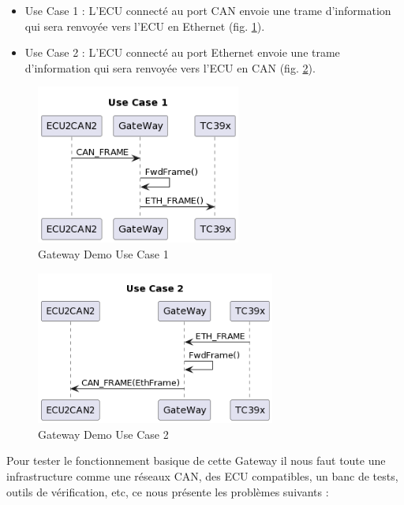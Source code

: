\begin{itemize} 

    \item Use Case 1 : L'ECU connect\'e au port CAN envoie une trame d'information qui sera renvoyée vers l'ECU en Ethernet (fig. \ref{fig:gw-demo-uc1}). 

    \item Use Case 2 : L'ECU connect\'e au port Ethernet envoie une trame d'information qui sera renvoyée vers l'ECU en CAN (fig. \ref{fig:gw-demo-uc2}). 

\end{itemize} 

\begin{figure}[!htb]
 \centering
 \includegraphics[width=0.6\textwidth]{img/GWUseCase1.png}
 \caption{Gateway Demo Use Case 1}
 \label{fig:gw-demo-uc1}
\end{figure}

\begin{figure}[!htb]
 \centering
 \includegraphics[width=0.7\textwidth]{img/GWUseCase2.png}
 \caption{Gateway Demo Use Case 2}
 \label{fig:gw-demo-uc2}
\end{figure}

Pour tester le fonctionnement basique de cette Gateway il nous faut toute une infrastructure comme une réseaux CAN, des ECU compatibles, un banc de tests, outils de vérification, etc, ce nous présente les problèmes suivants : 

